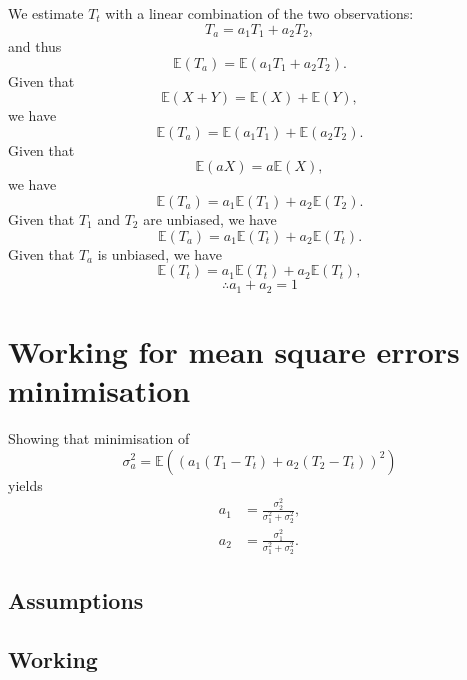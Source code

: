 We estimate $T_t$ with a linear combination of the two observations:
\begin{equation}
    T_a = a_1 T_1 + a_2 T_2,
\end{equation}
and thus
\begin{equation}
    \mathbb{E}(T_a) = \mathbb{E}(a_1 T_1 + a_2 T_2).
\end{equation}
Given that
\begin{equation}
    \mathbb{E}(X + Y) = \mathbb{E}(X) + \mathbb{E}(Y),
\end{equation}
we have
\begin{equation}
    \mathbb{E}(T_a) = \mathbb{E}(a_1 T_1) + \mathbb{E}(a_2 T_2).
\end{equation}
Given that
\begin{equation}
    \mathbb{E}(aX) = a \mathbb{E}(X),
\end{equation}
we have
\begin{equation}
    \mathbb{E}(T_a) = a_1 \mathbb{E}(T_1) + a_2 \mathbb{E}(T_2).
\end{equation}
Given that $T_1$ and $T_2$ are unbiased, we have
\begin{equation}
    \mathbb{E}(T_a) = a_1 \mathbb{E}(T_t) + a_2 \mathbb{E}(T_t).
\end{equation}
Given that $T_a$ is unbiased, we have
\begin{equation*}
    \mathbb{E}(T_t) = a_1 \mathbb{E}(T_t) + a_2 \mathbb{E}(T_t),
\end{equation*}
\begin{equation}
    \therefore a_1 + a_2 = 1
\end{equation}

\section{Working for mean square errors minimisation}
\label{sub:kalnay_working:mse}

Showing that minimisation of 
\begin{equation}
\sigma_a^2 = \mathbb{E} \left( \left( a_1(T_1 - T_t) + a_2(T_2 - T_t) \right)^2 \right)
\end{equation}
yields
\begin{subequations}
    \begin{align}
    a_1 &= \frac{\sigma_2^2}{\sigma_1^2 + \sigma_2^2}, \\
    a_2 &= \frac{\sigma_1^2}{\sigma_1^2 + \sigma_2^2}.
    \end{align}
\end{subequations}        

\subsection{Assumptions}
\label{sub:mse:assumptions}

\subsection{Working}
\label{sub:mse:working}
